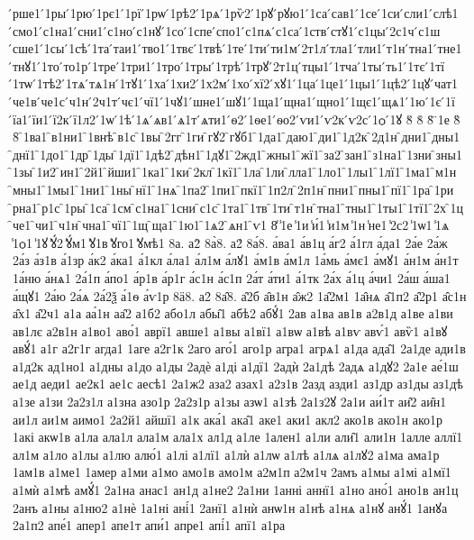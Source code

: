 {́рше1
́1ры
́1рю
́1рє1
́1рї
́1рѡ
́1рѣ2
́1рѧ
́1рѷ2
́1рꙋ
́рꙋю1
́1са
́сав1
́1се
́1си
́сли1
́слѣ1
́смо1
́с1на1
́сни1
́с1но
́с1нꙋ
́1со
́1спе
́спо1
́с1пѧ
́с1са
́1ств
́стꙋ1
́с1цы
́2с1ч
́с1ш
́сше1
́1сы
́1сѣ
́1та
́таи1
́тво1
́1твє
́1твѣ
́1те
́1ти
́ти1м
́2т1л
́тла1
́тли1
́т1н
́тна1
́тне1
́тнꙋ1
́1то
́то1р
́1тре
́1три1
́1тро
́1тры
́1трѣ
́1трꙋ
́2т1ц
́тцы1
́1тча
́1ты
́ть1
́1тє
́1тї
́1тѡ
́1тѣ2
́1тѧ
́тѧ1н
́1тꙋ1
́1ха
́1хи2
́1х2м
́1хо
́хї2
́хꙋ1
́1ца
́1це1
́1цы1
́1цѣ2
́1цꙋ
́чат1
́че1в
́че1с
́ч1н
́2ч1т
́чє1
́чї1
́1чꙋ1
́шне1
́шꙋ1
́1ща1
́щна1
́щно1
́1щє1
́щѧ1
́1ю
́1є
́1ї
́їа1
́їи1
́ї2к
́ї1л2
́1ѡ
́1ѣ
́1ѧ
́ѧв1
́ѧ1т
́ѧти1
́ѳ2
́1ѳе1
́ѳо2
́ѵи1
́ѵ2к
́ѵ2с
́1ѻ
́1ꙋ
8̆
8̇
8̈
̈1е
8̏
8̑
̑1ва1
̑в1ни1
̑1внѣ
̑в1с
̑1вы
̑2гг
̑1ги
̑гꙋ2
̑гꙋб1
̑1да1
̑даю1
̑ди1
̑1д2к
̑2д1н
̑дни1
̑дны1
̑днї1
̑1до1
̑1др
̑1ды
̑1дї1
̑1дѣ2
̑дѣн1
̑1дꙋ1
̑2жд1
̑жны1
̑жї1
̑за2
̑зан1
̑з1на1
̑1зни
̑зны1
̑1зы
̑1и2
̑ин1
̑2й1
̑йши1
̑1ка1
̑1ки
̑2кл
̑1кї1
̑1ла
̑1ли
̑лла1
̑1ло1
̑1лы1
̑1лї1
̑1ма1
̑м1н
̑мны1
̑1мы1
̑1ни1
̑1ны
̑нї1
̑1нѧ
̑1па2
̑1пи1
̑пкї1
̑1п2л
̑2п1н
̑пни1
̑пны1
̑пї1
̑1ра
̑1ри
̑рна1
̑р1с
̑1ры
̑1са
̑1см
̑с1на1
̑1сни
̑с1с
̑1та1
̑1тв
̑1ти
̑т1н
̑тна1
̑тны1
̑1ты1
̑1тї1
̑2х
̑1ц
̑че1
̑чи1
̑ч1н
̑чна1
̑чї1
̑1щ
̑ща1
̑1ю1
̑1ѧ2
̑ѧн1
̑ѵ1
8̾
̾1е
̾1и
̾и́1
̾и1м
̾1н
̾не1
̾2с2
̾1ѡ1
̾1ѧ
̾1ѻ1
̾1ꙋ
̾ꙋ́2
̾ꙋ́м1
̾ꙋ1в
̾ꙋго1
̾ꙋмѣ1
8а.
а2̀
8а̀8.
а2́
8а́8.
а́ва1
а́в1ц
а́г2
а́1гл
а́да1
2а́е
2а́ж
2а́з
а́з1в
а́1зр
а́к2
а́ка1
а́1кл
а́ла1
а́л1м
а́лꙋ1
а́м1в
а́м1л
1а́мь
а́мє1
а́мꙋ1
а́н1м
а́н1т
1а́ню
а́нѧ1
2а́1п
а́по1
а́р1в
а́р1г
а́с1н
а́с1п
2а́т
а́ти1
а́1тк
2а́х
а́1ц
а́чи1
2а́ш
а́ша1
а́щꙋ1
2а́ю
2а́ѧ
2а́2ѯ
а́1ѳ
а́ѵ1р
8ӓ8.
а2̑
8а̑8.
а̑2б
а̑в1н
а̑ж2
1а̑2м1
1а̑нѧ
а̑1п2
а̑2р1
а̑с1н
а̑х1
а̑2ч1
а1а
аа́1н
аа̑2
а1б2
або1л
абы̑1
абѣ2
абꙋ́1
2ав
а1ва
ав1в
а2в1д
а1ве
а1ви
ав1лє
а2в1н
а1во1
аво́1
аврї1
авше1
а1вы
а1вї1
а1вѡ
а1вѣ
а1вѵ
авѵ́1
авѷ1
а1вꙋ
авꙋ́1
а1г
а2г1г
агда1
1аге
а2г1к
2аго
аго́1
аго1р
агра1
агрѧ1
а1да
ада̑1
2а1де
ади1в
а1д2к
ад1но1
а1дны
а1до
а1ды
2адѐ
а1ді
а1дї1
2адѝ
2а1дѣ
2адѧ
а1дꙋ2
2а1е
ае́1ш
ае1д
аеди1
ае2к1
ае1с
аесѣ1
2а1ж2
аза2
азах1
а2з1в
2азд
азди1
аз1др
аз1ды
аз1дѣ
а1зе
а1зи
2а2з1л
а1зна
азо1р
2а2з1р
а1зы
азѡ1
а1зѣ
2а1з2ꙋ
2а1и
аи́1т
аи̑2
аи̑н1
аи1л
аи1м
аимо1
2а2й1
айшї1
а1к
ака́1
ака̑1
аке1
аки1
акл2
ако1в
ако1н
ако1р
1акі
акѡ1в
а1ла
ала1л
ала1м
ала1х
ал1д
а1ле
1ален1
а1ли
али̑1
али1н
1алле
аллї1
ал1м
а1ло
а1лы
а1лю
алю́1
а1лі
а1лї1
а1лѝ
а1лѡ
а1лѣ
а1лѧ
а1лꙋ2
а1ма
ама1р
1ам1в
а1ме1
1амер
а1ми
а1мо
амо1в
амо1м
а2м1п
а2м1ч
2амъ
а1мы
а1мі
а1мї1
а1мѝ
а1мѣ
амꙋ́1
2а1на
анас1
ан1д
а1не2
2а1ни
1анні
аннї1
а1но
ано́1
ано1в
ан1ц
2анъ
а1ны
а1ню2
а1нѐ
1а1ні
ані́1
2анї1
а1нѝ
анѡ1н
а1нѣ
а1нѧ
а1нꙋ
анꙋ́1
1анꙋа
2а1п2
апе́1
апер1
апе1т
апи́1
апре1
апі́1
апї1
а1ра
}
